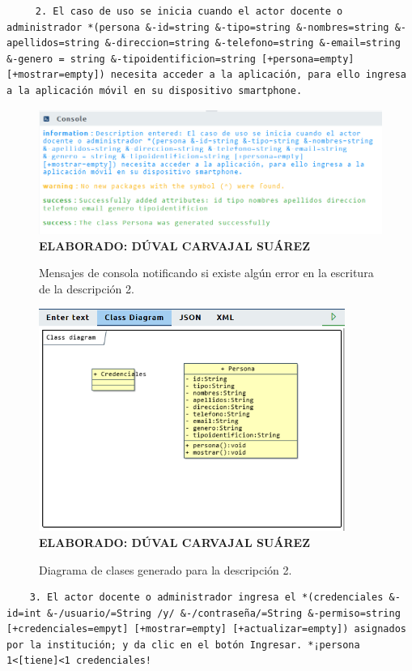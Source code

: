 \begin{lstlisting}
	 2. El caso de uso se inicia cuando el actor docente o administrador *(persona &-id=string &-tipo=string &-nombres=string &-apellidos=string &-direccion=string &-telefono=string &-email=string &-genero = string &-tipoidentificion=string [+persona=empty] [+mostrar=empty]) necesita acceder a la aplicación, para ello ingresa a la aplicación móvil en su dispositivo smartphone. \end{lstlisting}
 
 \begin{figure}[h!]
 	\caption{Mensajes de consola notificando si existe algún error en la escritura de la descripción 2.}
 	\includegraphics[width=14cm]{img/not-eva-002.png}
 	\label{fig:not_eva_002}
 	\textbf{\\ ELABORADO: DÚVAL CARVAJAL SUÁREZ}
 \end{figure}
 
 \begin{figure}[H]
 	\caption{Diagrama de clases generado para la descripción 2.}
 	\includegraphics[width=10cm]{img/dc-eva-002.png}
 	\label{fig:dc_eva_002}
 	\textbf{\\ ELABORADO: DÚVAL CARVAJAL SUÁREZ}
 \end{figure}
 
 \begin{lstlisting}
 	3. El actor docente o administrador ingresa el *(credenciales &-id=int &-/usuario/=String /y/ &-/contraseña/=String &-permiso=string [+credenciales=empyt] [+mostrar=empty] [+actualizar=empty]) asignados por la institución; y da clic en el botón Ingresar. *¡persona 1<[tiene]<1 credenciales! \end{lstlisting}
 
